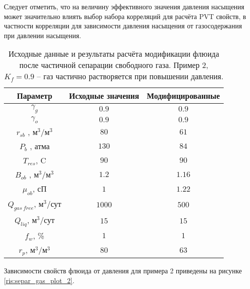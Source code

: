 Следует отметить, что на величину эффективного значения давления насыщения может значительно влиять выбор набора корреляций для расчёта PVT свойств, в частности корреляции для зависимости давления насыщения от газосодержания при давлении насыщения. 

\begin{table}[H]
	\centering
	\caption{Исходные данные и результаты расчёта модификации флюида после частичной сепарации свободного газа. Пример 2, $K_f=0.9$ -- газ частично растворяется при повышении давления.}
	\begin{tabular}{ |c|c|c|} 
		\hline
		Параметр & Исходные значения & Модифицированные \\ 
		\hline
		$\gamma_g$ 				&$0.9$	& $0.9$    \\ 
		$\gamma_o$ 					&$0.9$	& $0.9$   \\ 
		$r_{sb}$ ,  м$^3$/м$^3$ 		&$80$	& $61$ \\ 
		$P_b$ , атма 					&$130$	& $84$ 	 \\ 
		$T_{res} $,  C 					&$90$	& $90$ \\ 
		$B_{ob} $ , м$^3$/м$^3$  		&$1.2$	& $1.16$ \\ 
		$\mu_{ob}  $,  сП  				&$1$	& $1.22$   \\ 
		\hline
		$Q_{gas\ free}  $,  м$^3$/сут  	&$1000$	& $500$  \\ 
		$Q_{liq}  $,  м$^3$/сут  			&$15$	& $15$ \\ 
		$f_{w}  $,  \%  					&$1$	& $1$  \\ 
		$r_p  $,  м$^3$/м$^3$  			&$80$	& $63$ \\ 
		\hline
	\end{tabular}
\label{table:separ_gas_table_2}
\end{table}

Зависимости свойств флюида от давления для примера 2 приведены на рисунке \ref{ris:separ_gas_plot_2}.


